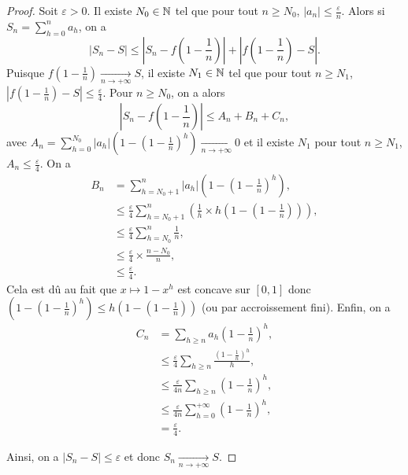 \documentclass[12pt]{article}
\begin{document}
\begin{proof}
    Soit $\varepsilon>0$. Il existe $N_{0}\in\mathbb{N}$ tel que pour tout $n\geqslant N_{0}$, $\left\lvert a_n\right\rvert\leqslant\frac{\varepsilon}{n}$. Alors si $S_n=\sum_{h=0}^{n}a_h$, on a 
    \begin{equation}
        \left\lvert S_n-S\right\rvert\leqslant \left\lvert S_n-f\left(1-\frac{1}{n}\right)\right\rvert+\left\lvert f\left(1-\frac{1}{n}\right)-S\right\rvert.
    \end{equation}
    Puisque $f\left(1-\frac{1}{n}\right)\xrightarrow[n\to+\infty]{}S$, il existe $N_{1}\in\mathbb{N}$ tel que pour tout $n\geqslant N_{1}$, $\left\lvert f\left(1-\frac{1}{n}\right)-S\right\rvert\leqslant\frac{\varepsilon}{4}$. Pour $n\geqslant N_{0}$, on a alors 
    \begin{equation}
        \left\lvert S_n-f\left(1-\frac{1}{n}\right)\right\rvert\leqslant A_n+B_n+C_n,
    \end{equation}
    avec $A_n=\sum_{h=0}^{N_{0}}\left\lvert a_h\right\rvert\left(1-\left(1-\frac{1}{n}\right)^{h}\right)\xrightarrow[n\to+\infty]{}0$ et il existe $N_{1}$ pour tout $n\geqslant N_{1}$, $A_n\leqslant\frac{\varepsilon}{4}$. On a 
    \begin{align}
        B_n
        &= \sum_{h=N_{0}+1}^{n}\left\lvert a_{h}\right\rvert\left(1-\left(1-\frac{1}{n}\right)^{h}\right),\\
        &\leqslant\frac{\varepsilon}{4}\sum_{h=N_{0}+1}^{n}\left(\frac{1}{h}\times h\left(1-\left(1-\frac{1}{n}\right)\right)\right),\\
        &\leqslant\frac{\varepsilon}{4}\sum_{h=N_{0}}^{n}\frac{1}{n},\\
        &\leqslant\frac{\varepsilon}{4}\times\frac{n-N_{0}}{n},\\
        &\leqslant\frac{\varepsilon}{4}.
    \end{align}
    Cela est dû au fait que $x\mapsto1-x^{h}$ est concave sur $[0,1]$ donc $\left(1-\left(1-\frac{1}{n}\right)^{h}\right)\leqslant h\left(1-\left(1-\frac{1}{n}\right)\right)$ (ou par accroissement fini). Enfin, on a 
    \begin{align}
        C_n
        &=\sum_{h\geqslant n}a_h\left(1-\frac{1}{n}\right)^{h},\\
        &\leqslant\frac{\varepsilon}{4}\sum_{h\geqslant n}\frac{\left(1-\frac{1}{n}\right)^{h}}{h},\\
        &\leqslant\frac{\varepsilon}{4n}\sum_{h\geqslant n}\left(1-\frac{1}{n}\right)^{h},\\
        &\leqslant\frac{\varepsilon}{4n}\sum_{h=0}^{+\infty}\left(1-\frac{1}{n}\right)^{h},\\
        &=\frac{\varepsilon}{4}.
    \end{align}

    Ainsi, on a $\left\lvert S_n-S\right\rvert\leqslant\varepsilon$ et donc $S_n\xrightarrow[n\to+\infty]{}S$.
\end{proof}
\end{document}
